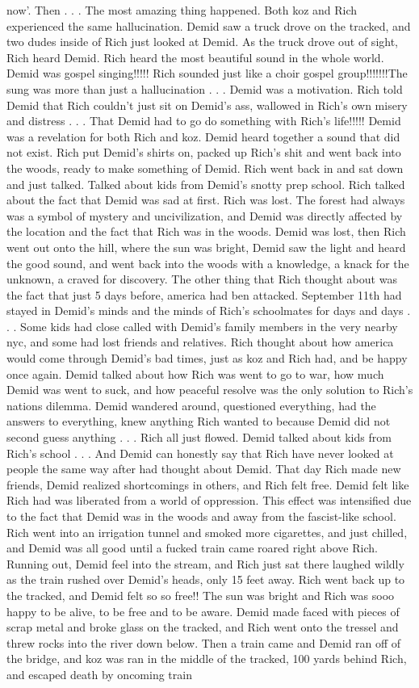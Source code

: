 \documentclass[12pt]{book}
\begin{document}
now'. Then . . .  The most amazing thing happened. Both koz and Rich experienced the same hallucination. Demid saw a truck drove on the tracked, and two dudes inside of Rich just looked at Demid. As the truck drove out of sight, Rich heard Demid. Rich heard the most beautiful sound in the whole world. Demid was gospel singing!!!!! Rich sounded just like a choir gospel group!!!!!!!The sung was more than just a hallucination . . .  Demid was a motivation. Rich told Demid that Rich couldn't just sit on Demid's ass, wallowed in Rich's own misery and distress . . .  That Demid had to go do something with Rich's life!!!!! Demid was a revelation for both Rich and koz. Demid heard together a sound that did not exist. Rich put Demid's shirts on, packed up Rich's shit and went back into the woods, ready to make something of Demid. Rich went back in and sat down and just talked. Talked about kids from Demid's snotty prep school. Rich talked about the fact that Demid was sad at first. Rich was lost. The forest had always was a symbol of mystery and uncivilization, and Demid was directly affected by the location and the fact that Rich was in the woods. Demid was lost, then Rich went out onto the hill, where the sun was bright, Demid saw the light and heard the good sound, and went back into the woods with a knowledge, a knack for the unknown, a craved for discovery. The other thing that Rich thought about was the fact that just 5 days before, america had ben attacked. September 11th had stayed in Demid's minds and the minds of Rich's schoolmates for days and days . . .  Some kids had close called with Demid's family members in the very nearby nyc, and some had lost friends and relatives. Rich thought about how america would come through Demid's bad times, just as koz and Rich had, and be happy once again. Demid talked about how Rich was went to go to war, how much Demid was went to suck, and how peaceful resolve was the only solution to Rich's nations dilemma. Demid wandered around, questioned everything, had the answers to everything, knew anything Rich wanted to because Demid did not second guess anything . . .  Rich all just flowed. Demid talked about kids from Rich's school . . .  And Demid can honestly say that Rich have never looked at people the same way after had thought about Demid. That day Rich made new friends, Demid realized shortcomings in others, and Rich felt free. Demid felt like Rich had was liberated from a world of oppression. This effect was intensified due to the fact that Demid was in the woods and away from the fascist-like school. Rich went into an irrigation tunnel and smoked more cigarettes, and just chilled, and Demid was all good until a fucked train came roared right above Rich. Running out, Demid feel into the stream, and Rich just sat there laughed wildly as the train rushed over Demid's heads, only 15 feet away. Rich went back up to the tracked, and Demid felt so so free!! The sun was bright and Rich was sooo happy to be alive, to be free and to be aware. Demid made faced with pieces of scrap metal and broke glass on the tracked, and Rich went onto the tressel and threw rocks into the river down below. Then a train came and Demid ran off of the bridge, and koz was ran in the middle of the tracked, 100 yards behind Rich, and escaped death by oncoming train 
\end{document}
